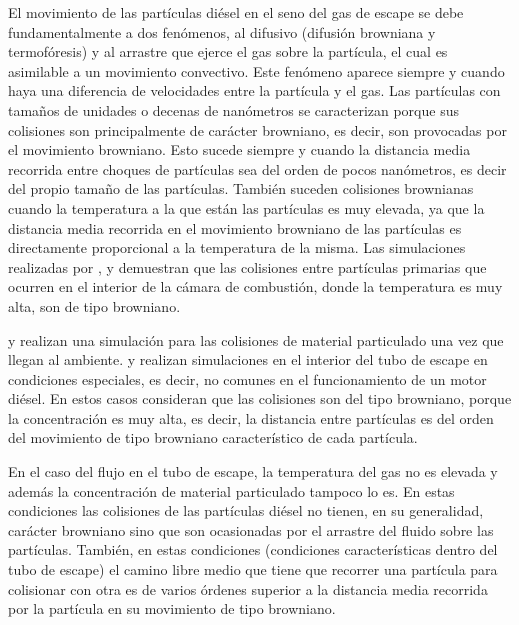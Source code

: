\par El movimiento de las partículas diésel en el seno del gas de escape se debe fundamentalmente a dos fenómenos, al difusivo (difusión browniana y termofóresis) y al arrastre que ejerce el gas sobre la partícula, el cual es asimilable a un movimiento convectivo. Este fenómeno aparece siempre y cuando haya una diferencia de velocidades entre la partícula y el gas. Las partículas con tamaños de unidades o decenas de nanómetros se caracterizan porque sus colisiones son principalmente de carácter browniano, es decir, son provocadas por el movimiento browniano. Esto sucede siempre y cuando la distancia media recorrida entre choques de partículas sea del orden de pocos nanómetros, es decir del propio tamaño de las partículas. También suceden colisiones brownianas cuando la temperatura a la que están las partículas es muy elevada, ya que la distancia media recorrida en el movimiento browniano de las partículas es directamente proporcional a la temperatura de la misma. Las simulaciones realizadas por \cite{frenklach:2002}, \cite{kazakovetal:1998} y \cite{stasioetal:2002} demuestran que las colisiones entre partículas primarias que ocurren en el interior de la cámara de combustión, donde la temperatura es muy alta, son de tipo browniano.

\par \cite{kimetal:2002} y \cite{kimetal2:2002} realizan una simulación para las colisiones de material particulado una vez que llegan al ambiente. \cite{hisaedaetal:2000} y \cite{hayasietal:1999} realizan simulaciones en el interior del tubo de escape en condiciones especiales, es decir, no comunes en el funcionamiento de un motor diésel. En estos casos consideran que las colisiones son del tipo browniano, porque la concentración es muy alta, es decir, la distancia entre partículas es del orden del movimiento de tipo browniano característico de cada partícula.

\par En el caso del flujo en el tubo de escape, la temperatura del gas no es elevada y además la concentración de material particulado tampoco lo es. En estas condiciones las colisiones de las partículas diésel no tienen, en su generalidad, carácter browniano sino que son ocasionadas por el arrastre del fluido sobre las partículas. También, en estas condiciones (condiciones características dentro del tubo de escape) el camino libre medio que tiene que recorrer una partícula para colisionar con otra es de varios órdenes superior a la distancia media recorrida por la partícula en su movimiento de tipo browniano.

